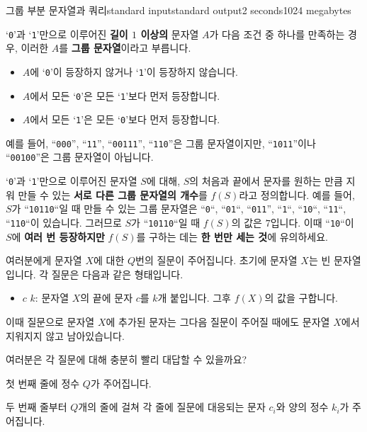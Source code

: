 \begin{problem}{그룹 부분 문자열과 쿼리}{standard input}{standard output}{2 seconds}{1024 megabytes}

`\texttt{0}'과 `\texttt{1}'만으로 이루어진 \textbf{길이 $1$ 이상의} 문자열 $A$가 다음 조건 중 하나를 만족하는 경우, 이러한 $A$를 \textbf{그룹 문자열}이라고 부릅니다.

\begin{itemize}
\item $A$에 `\texttt{0}'이 등장하지 않거나 `\texttt{1}'이 등장하지 않습니다.
\item $A$에서 모든 `\texttt{0}'은 모든 `\texttt{1}'보다 먼저 등장합니다.
\item $A$에서 모든 `\texttt{1}'은 모든 `\texttt{0}'보다 먼저 등장합니다.
\end{itemize}

예를 들어, ``\texttt{000}'', ``\texttt{11}'', ``\texttt{00111}'', ``\texttt{110}''은 그룹 문자열이지만, ``\texttt{1011}''이나 ``\texttt{00100}''은 그룹 문자열이 아닙니다.

`\texttt{0}'과 `\texttt{1}'만으로 이루어진 문자열 $S$에 대해, $S$의 처음과 끝에서 문자를 원하는 만큼 지워 만들 수 있는 \textbf{서로 다른 그룹 문자열의 개수}를 $f(S)$라고 정의합니다. 예를 들어, $S$가 ``\texttt{10110}``일 때 만들 수 있는 그룹 문자열은 ``\texttt{0}``, ``\texttt{01}``, ``\texttt{011}'', ``\texttt{1}``, ``\texttt{10}``, ``\texttt{11}``, ``\texttt{110}``이 있습니다. 그러므로 $S$가 ``\texttt{10110}``일 때 $f(S)$의 값은 $7$입니다. 이때 ``\texttt{10}``이 $S$에 \textbf{여러 번 등장하지만} $f(S)$를 구하는 데는 \textbf{한 번만 세는 것}에 유의하세요.

여러분에게 문자열 $X$에 대한 $Q$번의 질문이 주어집니다. 초기에 문자열 $X$는 빈 문자열입니다. 각 질문은 다음과 같은 형태입니다.

\begin{itemize}
\item $c$ $k$: 문자열 $X$의 끝에 문자 $c$를 $k$개 붙입니다. 그후 $f(X)$의 값을 구합니다.
\end{itemize}

이때 질문으로 문자열 $X$에 추가된 문자는 그다음 질문이 주어질 때에도 문자열 $X$에서 지워지지 않고 남아있습니다.

여러분은 각 질문에 대해 충분히 빨리 대답할 수 있을까요?

\InputFile
첫 번째 줄에 정수 $Q$가 주어집니다.

두 번째 줄부터 $Q$개의 줄에 걸쳐 각 줄에 질문에 대응되는 문자 $c_i$와 양의 정수 $k_i$가 주어집니다.


\end{problem}
